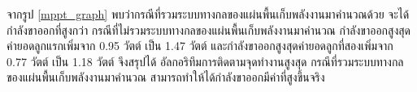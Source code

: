 \documentclass[11pt,a4paper]{article}
\begin{document}
จากรูป \ref{mppt_graph} พบว่ากรณีที่รวมระบบทางกลของแผ่นพื้นเก็บพลังงานมาคำนวณด้วย จะได้กำลังขาออกที่สูงกว่า กรณีที่ไม่รวมระบบทางกลของแผ่นพื้นเก็บพลังงานมาคำนวณ
กำลังขาออกสูงสุดค่ายอดลูกแรกเพิ่มจาก 0.95 วัตต์ เป็น 1.47 วัตต์ และกำลังขาออกสูงสุดค่ายอดลูกที่สองเพิ่มจาก 0.77 วัตต์ เป็น 1.18 วัตต์ จึงสรุปได้ อัลกอริทึมการติดตามจุดทำงานสูงสุด กรณีที่รวมระบบทางกลของแผ่นพื้นเก็บพลังงานมาคำนวณ สามารถทำให้ได้กำลังขาออกมีค่าที่สูงขึ้นจริง














\end{document}
